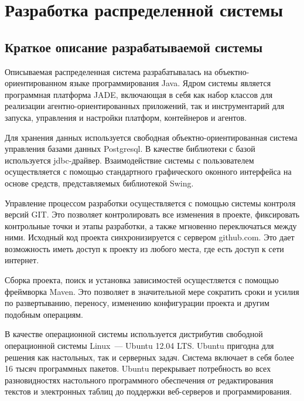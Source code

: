 \updateStamp
{}
\section{Разработка распределенной системы}
\subsection{Краткое описание разрабатываемой системы}
Описываемая распределенная система разрабатывалась на объектно-ориентированном языке программирования Java. Ядром системы является программная платформа JADE, включающая в себя как набор классов для реализации агентно-ориентированных приложений, так и инструментарий для запуска, управления и настройки платформ, контейнеров и агентов.

	Для хранения данных используется свободная объектно-ориентированная система управления базами данных Postgresql. В качестве библиотеки с базой используется jdbc-драйвер. Взаимодействие системы с пользователем осуществляется с помощью стандартного графического оконного интерфейса на основе средств, представляемых библиотекой Swing.

	Управление процессом разработки осуществляется с помощью системы контроля версий GIT. Это позволяет контролировать все изменения в проекте, фиксировать контрольные точки и этапы разработки, а также мгновенно переключаться между ними. Исходный код проекта синхронизируется с сервером github.com. Это дает возможность иметь доступ к проекту из любого места, где есть доступ к сети интернет.

	Сборка проекта, поиск и установка зависимостей осущестляется с помощью фреймворка Maven. Это позволяет в значительной мере сократить сроки и усилия по развертыванию, переносу, изменению конфигурации проекта и другим подобным операциям.

В качестве операционной системы используется дистрибутив свободной операционной системы Linux~--- Ubuntu 12.04 LTS. Ubuntu пригодна для решения как настольных, так и серверных задач. Система включает в себя более 16 тысяч программных пакетов. Ubuntu перекрывает потребность во всех разновидностях настольного программного обеспечения от редактирования текстов и электронных таблиц до поддержки веб-серверов и программирования. 

